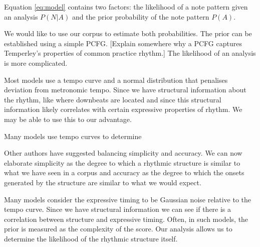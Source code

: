 Equation \ref{eq:model} contains two factors: the likelihood of a note pattern given an analysis $P(N|A)$ and the prior probability of the note pattern $P(A)$. 

We would like to use our corpus to estimate both probabilities. The prior can be established using a simple PCFG. [Explain somewhere why a PCFG captures Temperley's properties of common practice rhythm.] The likelihood of an analysis is more complicated.

Most models use a tempo curve and a normal distribution that penalises deviation from metronomic tempo. Since we have structural information about the rhythm, like where downbeats are located and since this structural information likely correlates with certain expressive properties of rhythm. We may be able to use this to our advantage. 

Many models use tempo curves to determine

Other authors have suggested balancing simplicity and accuracy. We can now elaborate simplicity as the degree to which a rhythmic structure is similar to what we have seen in a corpus and accuracy as the degree to which the onsets generated by the structure are similar to what we would expect.

Many models consider the expressive timing to be Gaussian noise relative to the tempo curve. Since we have structural information we can see if there is a correlation between structure and expressive timing. Often, in such models, the prior is measured as the complexity of the score. Our analysis allows us to determine the likelihood of the rhythmic structure itself. 








